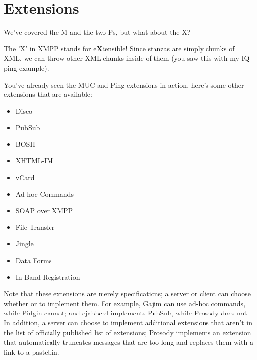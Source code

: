 \section{Extensions}

\pause

We've covered the M and the two Ps, but what about the X?

\pause

The 'X' in XMPP stands for e\textbf{X}tensible!  Since stanzas are simply chunks of XML,
we can throw other XML chunks inside of them (you saw this with my IQ ping example).

\pause
You've already seen the MUC and Ping extensions in action, here's some other extensions that
are available:

\pause
\begin{itemize}
\setlength{\itemsep}{1pt}

\item Disco
\pause
\item PubSub
\pause
\item BOSH
\pause
\item XHTML-IM
\pause
\item vCard
\pause
\item Ad-hoc Commands
\pause
\item SOAP over XMPP
\pause
\item File Transfer
\pause
\item Jingle
\pause
\item Data Forms
\pause
\item In-Band Registration
\end{itemize}

\pause

Note that these extensions are merely specifications; a server or client can choose whether or to implement
them.  For example, Gajim can use ad-hoc commands, while Pidgin cannot; and ejabberd implements PubSub, while
Prosody does not.  In addition, a server can choose to implement additional extensions that aren't in the list
of officially published list of extensions; Prosody implements an extension that automatically truncates messages
that are too long and replaces them with a link to a pastebin.
